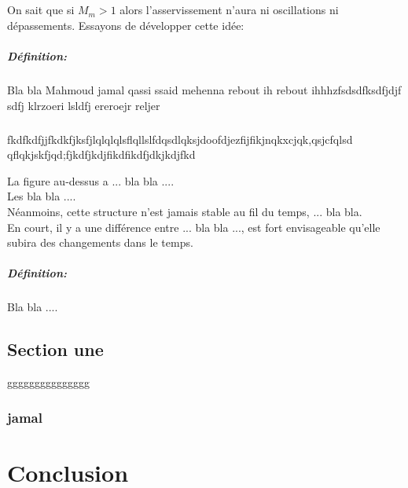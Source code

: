 \documentclass[12pt, a4paper, openany]{report}
\begin{document}
  \paragraph{}
  On sait que si $ M_{m}>1 $ alors l'asservissement n'aura ni oscillations ni dépassements. Essayons de développer cette idée: \\
  
  
  
      
  
  
  
  \paragraph{Définition:}
  
Bla bla Mahmoud jamal qassi ssaid mehenna rebout ih rebout ihhhzfsdsdfksdfjdjf sdfj klrzoeri lsldfj 
ereroejr reljer
  
  \paragraph{}
  fkdfkdfjjfkdkfjksfjlqlqlqlsflqllslfdqsdlqksjdoofdjezfijfikjnqkxcjqk,qsjcfqlsd
  qflqkjskfjqd;fjkdfjkdjfikdfikdfjdkjkdjfkd  
   
 La figure au-dessus a ... bla bla ....\\
 
 Les bla bla ....\\
 
 Néanmoins, cette structure n’est jamais stable au fil du temps, ... bla bla.\\
  
 En court, il y a une différence entre ... bla bla ..., est fort envisageable qu’elle subira des changements dans le temps.
 
 \paragraph{Définition:}
  Bla bla ....

 \section{Section une}
  ggggggggggggggg
  \subsection{jamal}

\chapter*{Conclusion}
 

  
\end{document}

